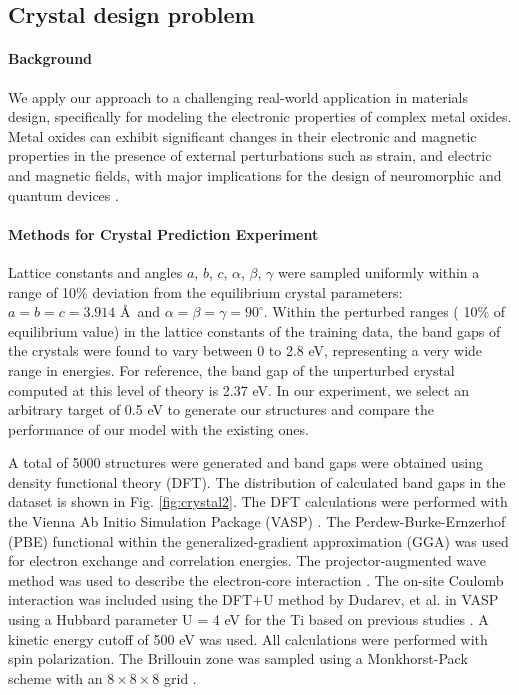 \documentclass[letterpaper]{article} %
\begin{document}
\subsection{Crystal design problem}
\paragraph{Background}
We apply our approach to a challenging real-world application in materials design, specifically for modeling the electronic properties of complex metal oxides. Metal oxides can exhibit significant changes in their electronic and magnetic properties in the presence of external perturbations such as strain, and electric and magnetic fields, with major implications for the design of neuromorphic and quantum devices \cite{RN6466, RN6431, RN6467}.


\paragraph{Methods for Crystal Prediction Experiment}
Lattice constants and angles $a$, $b$, $c$, $\alpha$, $\beta$, $\gamma$ were sampled uniformly within a range of 10\% deviation from the equilibrium crystal parameters: $a=b=c=3.914$ \AA ~and  $\alpha=\beta=\gamma=90^{\circ}$. Within the perturbed ranges ( 10\% of equilibrium value) in the lattice constants of the training data, the band gaps of the crystals were found to vary between 0 to 2.8 eV, representing a very wide range in energies. For reference, the band gap of the unperturbed crystal computed at this level of theory is 2.37 eV. In our experiment, we select an arbitrary target of 0.5 eV to generate our structures and compare the performance of our model with the existing ones. 

A total of 5000 structures were generated and band gaps were obtained using density functional theory (DFT). The distribution of calculated band gaps in the dataset is shown in Fig. \ref{fig:crystal2}. The DFT calculations were performed with the Vienna Ab Initio Simulation Package (VASP) \cite{RN138, RN144}. The Perdew-Burke-Ernzerhof (PBE)\cite{RN145} functional within the generalized-gradient approximation (GGA) was used for electron exchange and correlation energies. The projector-augmented wave method was used to describe the electron-core interaction \cite{RN141, RN138}. The on-site Coulomb interaction was included using the DFT+U method by Dudarev, et al.\cite{RN147} in VASP using a Hubbard parameter U = 4 eV for the Ti based on previous studies \cite{RN6481, RN6480}.  A kinetic energy cutoff of 500 eV was used. All calculations were performed with spin polarization. The Brillouin zone was sampled using a Monkhorst-Pack scheme with an $8\times8\times8$ grid \cite{RN148}. 
\end{document}
